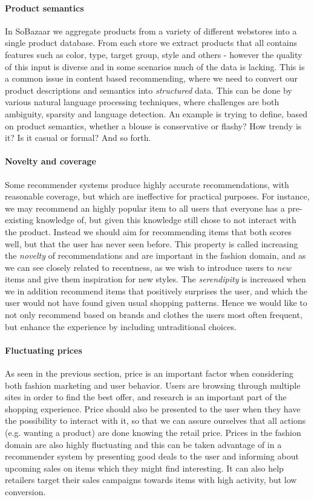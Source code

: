 \paragraph{Product semantics}
In SoBazaar we aggregate products from a variety of different webstores into a
single product database. From each store we extract products that all contains
features such as color, type, target group, style and others - however the
quality of this input is diverse and in some scenarios much of the data is
lacking. This is a common issue in content based recommending, where we need to
convert our product descriptions and semantics into \textit{structured} data.
This can be done by various natural language processing techniques, where
challenges are both ambiguity, sparsity and language detection. An example is
trying to define, based on product semantics, whether a blouse is conservative
or flashy? How trendy is it? Is it casual or formal? And so
forth.~\cite{ghani2002building}

\paragraph{Novelty and coverage}
Some recommender systems produce highly accurate recommendations, with
reasonable coverage, but which are ineffective for practical purposes. For
instance, we may recommend an highly popular item to all users that everyone
has a pre-existing knowledge of, but given this knowledge still chose to not
interact with the product. Instead we should aim for recommending items that
both scores well, but that the user has never seen before. This property is
called increasing the \textit{novelty} of recommendations and are important in
the fashion domain, and as we can see closely related to recentness, as we wish
to introduce users to \textit{new} items and give them inspiration for new
styles. The \textit{serendipity} is increased when we in addition recommend
items that positively surprises the user, and which the user would not have
found given usual shopping patterns. Hence we would like to not only recommend
based on brands and clothes the users most often frequent, but enhance the
experience by including untraditional choices.

\paragraph{Fluctuating prices}
As seen in the previous section, price is an important factor when considering
both fashion marketing and user behavior. Users are browsing through multiple
sites in order to find the best offer, and research is an important part of the
shopping experience. Price should also be presented to the user when they have
the possibility to interact with it, so that we can assure ourselves that all
actions (e.g. wanting a product) are done knowing the retail price. Prices in
the fashion domain are also highly fluctuating and this can be taken advantage
of in a recommender system by presenting good deals to the user and informing
about upcoming sales on items which they might find interesting. It can also
help retailers target their sales campaigns towards items with high activity,
but low conversion.

